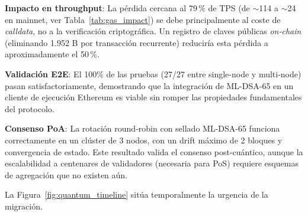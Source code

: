 \textbf{Impacto en throughput}: La pérdida cercana al 79\,\% de TPS (de $\sim$114 a $\sim$24 en mainnet, ver Tabla~\ref{tab:gas_impact}) se debe principalmente al coste de \emph{calldata}, no a la verificación criptográfica. Un registro de claves públicas \emph{on-chain} (eliminando 1.952 B por transacción recurrente) reduciría esta pérdida a aproximadamente el 50\,\%.

\textbf{Validación E2E}: El 100\% de las pruebas (27/27 entre single-node y multi-node) pasan satisfactoriamente, demostrando que la integración de ML-DSA-65 en un cliente de ejecución Ethereum es viable sin romper las propiedades fundamentales del protocolo.

\textbf{Consenso PoA}: La rotación round-robin con sellado ML-DSA-65 funciona correctamente en un clúster de 3 nodos, con un drift máximo de 2 bloques y convergencia de estado. Este resultado valida el consenso post-cuántico, aunque la escalabilidad a centenares de validadores (necesaria para PoS) requiere esquemas de agregación que no existen aún.

La Figura~\ref{fig:quantum_timeline} sitúa temporalmente la urgencia de la migración.

